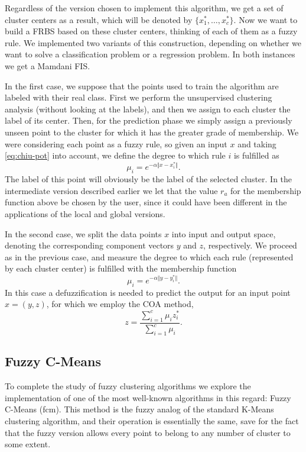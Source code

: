 Regardless of the version chosen to implement this algorithm, we get a set of cluster centers as a result, which will be denoted by $\{x_1^\ast, \dots, x_c^\ast \}$. Now we want to build a FRBS based on these cluster centers, thinking of each of them as a fuzzy rule. We implemented two variants of this construction, depending on whether we want to solve a classification problem or a regression problem. In both instances we get a Mamdani FIS.

In the first case, we suppose that the points used to train the algorithm are labeled with their real class. First we perform the unsupervised clustering analysis (without looking at the labels), and then we assign to each cluster the label of its center. Then, for the prediction phase we simply assign a previously unseen point to the cluster for which it has the greater grade of membership. We were considering each point as a fuzzy rule, so given an input $x$ and taking \eqref{eq:chiu-pot} into account, we define the degree to which rule $i$ is fulfilled as
\[
\mu_i = e^{-\alpha \Vert x - x_i^\ast \Vert}.
\]
The label of this point will obviously be the label of the selected cluster. In the intermediate version described earlier we let that the value $r_a$ for the membership function above be chosen by the user, since it could have been different in the applications of the local and global versions.

In the second case, we split the data points $x$ into input and output space, denoting the corresponding component vectors $y$ and $z$, respectively. We proceed as in the previous case, and measure the degree to which each rule (represented by each cluster center) is fulfilled with the membership function
\[
\mu_i = e^{-\alpha \Vert y - y_i^\ast \Vert}.
\]
In this case a defuzzification is needed to predict the output for an input point $x=(y,z)$, for which we employ the COA method,
\[
z = \dfrac{\displaystyle \sum_{i=1}^c \mu_iz_i^\ast}{\displaystyle \sum_{i=1}^c \mu_i}.
\]

\subsection{Fuzzy C-Means}

To complete the study of fuzzy clustering algorithms we explore the implementation of one of the most well-known algorithms in this regard: Fuzzy C-Means (\acrshort{fcm}). This method is the fuzzy analog of the standard K-Means clustering algorithm, and their operation is essentially the same, save for the fact that the fuzzy version allows every point to belong to any number of cluster to some extent.

